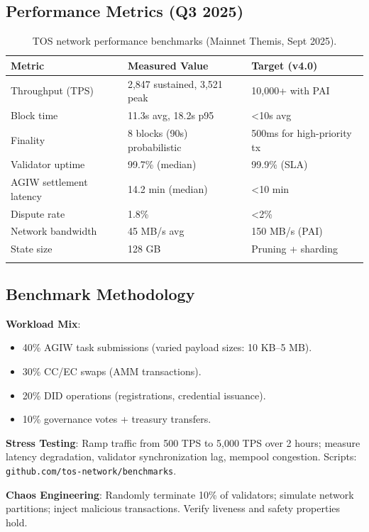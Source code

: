 \documentclass[11pt]{article}
\begin{document}
\subsection{Performance Metrics (Q3 2025)}

\begin{longtable}{@{}p{}p{}p{}@{}}
\toprule
\textbf{Metric} & \textbf{Measured Value} & \textbf{Target (v4.0)} \\\midrule
Throughput (TPS) & 2,847 sustained, 3,521 peak & 10,000+ with PAI \\
Block time & 11.3s avg, 18.2s p95 & <10s avg \\
Finality & 8 blocks (90s) probabilistic & 500ms for high-priority tx \\
Validator uptime & 99.7\% (median) & 99.9\% (SLA) \\
AGIW settlement latency & 14.2 min (median) & <10 min \\
Dispute rate & 1.8\% & <2\% \\
Network bandwidth & 45 MB/s avg & 150 MB/s (PAI) \\
State size & 128 GB & Pruning + sharding \\
\bottomrule
\caption{TOS network performance benchmarks (Mainnet Themis, Sept 2025).}
\end{longtable}

\subsection{Benchmark Methodology}

\textbf{Workload Mix}:
\begin{itemize}[noitemsep]
  \item 40\% AGIW task submissions (varied payload sizes: 10 KB--5 MB).
  \item 30\% CC/EC swaps (AMM transactions).
  \item 20\% DID operations (registrations, credential issuance).
  \item 10\% governance votes + treasury transfers.
\end{itemize}

\textbf{Stress Testing}: Ramp traffic from 500 TPS to 5,000 TPS over 2 hours; measure latency degradation, validator synchronization lag, mempool congestion. Scripts: \texttt{github.com/tos-network/benchmarks}.

\textbf{Chaos Engineering}: Randomly terminate 10\% of validators; simulate network partitions; inject malicious transactions. Verify liveness and safety properties hold.
\end{document}
